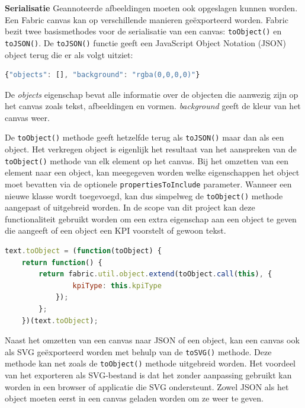 \textbf{Serialisatie} \cite{FabricJSIntro3Serialization} \break 
Geannoteerde afbeeldingen moeten ook opgeslagen kunnen worden. Een Fabric canvas kan op verschillende manieren ge\"{e}xporteerd worden. Fabric bezit twee basismethodes voor de serialisatie van een canvas: \lstinline{toObject()} en \lstinline{toJSON()}. De \lstinline{toJSON()} functie geeft een JavaScript Object Notation (JSON) object terug die er als volgt uitziet:

\begin{lstlisting}[language=javascript]
 {"objects": [], "background": "rgba(0,0,0,0)"}
\end{lstlisting} 

De \textit{objects} eigenschap bevat alle informatie over de objecten die aanwezig zijn op het canvas zoals tekst, afbeeldingen en vormen. \textit{background} geeft de kleur van het canvas weer. 


De \lstinline{toObject()} methode geeft hetzelfde terug als \lstinline{toJSON()} maar dan als een object. Het verkregen object is eigenlijk het resultaat van het aanspreken van de \lstinline{toObject()} methode van elk element op het canvas. Bij het omzetten van een element naar een object, kan meegegeven worden welke eigenschappen het object moet bevatten via de optionele \lstinline{propertiesToInclude} parameter. Wanneer een nieuwe klasse wordt toegevoegd, kan dus simpelweg de \lstinline{toObject()} methode aangepast of uitgebreid worden. In de scope van dit project kan deze functionaliteit gebruikt worden om een extra eigenschap aan een object te geven die aangeeft of een object een KPI voorstelt of gewoon tekst.  

\begin{lstlisting}[language=javascript]
	text.toObject = (function(toObject) {   
	return function() {     
		return fabric.util.object.extend(toObject.call(this), {       
				kpiType: this.kpiType     
			});   
		}; 
	})(text.toObject);
\end{lstlisting}

Naast het omzetten van een canvas naar JSON of een object, kan een canvas ook als SVG ge\"{e}xporteerd worden met behulp van de \lstinline{toSVG()} methode. Deze methode kan net zoals de \lstinline{toObject()} methode uitgebreid worden. Het voordeel van het exporteren als SVG-bestand is dat het zonder aanpassing gebruikt kan worden in een browser of applicatie die SVG ondersteunt. Zowel JSON als het object moeten eerst in een canvas geladen worden om ze weer te geven. 

